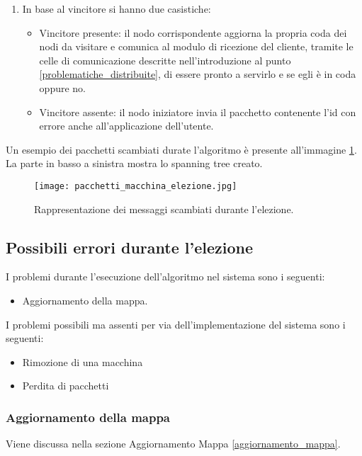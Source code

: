 \begin{enumerate}
	\item In base al vincitore si hanno due casistiche:
		\begin{itemize}
			\item Vincitore presente: il nodo corrispondente aggiorna la propria coda dei nodi da visitare e comunica al modulo di ricezione del cliente, tramite le celle di comunicazione descritte nell'introduzione al punto \ref{problematiche_distribuite}, di essere pronto a servirlo e se egli è in coda oppure no.
			\item Vincitore assente: il nodo iniziatore invia il pacchetto contenente l'id con errore anche all'applicazione dell'utente.
		\end{itemize}
\end{enumerate}

Un esempio dei pacchetti scambiati durate l'algoritmo è presente all'immagine \ref{fig:pacchetti_macchina_elezione}. La parte in basso a sinistra mostra lo spanning tree creato.

\begin{figure}[htbp]
	\centering
	\texttt{[image: pacchetti\_macchina\_elezione.jpg]}
	\caption{Rappresentazione dei messaggi scambiati durante l'elezione.}
	\label{fig:pacchetti_macchina_elezione}
\end{figure}

\newpage

\subsection{Possibili errori durante l'elezione}

I problemi durante l'esecuzione dell'algoritmo nel sistema sono i seguenti:
\begin{itemize}
	\item Aggiornamento della mappa.
\end{itemize}

I problemi possibili ma assenti per via dell'implementazione del sistema sono i seguenti:
\begin{itemize}
	\item Rimozione di una macchina
	\item Perdita di pacchetti
\end{itemize}

\subsubsection{Aggiornamento della mappa}
Viene discussa nella sezione Aggiornamento Mappa \ref{aggiornamento_mappa}.

